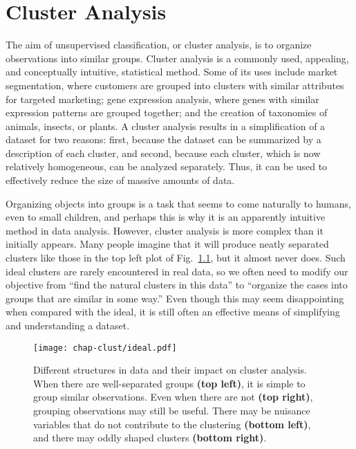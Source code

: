 

\chapter{Cluster Analysis}


The aim of unsupervised classification, or cluster analysis, is to
organize observations into similar groups.  Cluster analysis is a
commonly used, appealing, and conceptually intuitive, statistical
method.  Some of its uses include market segmentation, where customers
are grouped into clusters with similar attributes for targeted
marketing; gene expression analysis, where genes with similar
expression patterns are grouped together; and the creation of
taxonomies of animals, insects, or plants. A cluster analysis results
in a simplification of a dataset for two reasons: first, because the
dataset can be summarized by a description of each cluster, and
second, because each cluster, which is now relatively homogeneous, can
be analyzed separately.  Thus, it can be used to effectively reduce
the size of massive amounts of data.

Organizing objects into groups is a task that seems to come naturally
to humans, even to small children, and perhaps this is why it is an
apparently intuitive method in data analysis.  However, cluster
analysis is more complex than it initially appears.  Many people
imagine that it will produce neatly separated clusters like those in
the top left plot of Fig.~\ref{ideal-clusters}, but it almost never
does.  Such ideal clusters are rarely encountered in real data, so we
often need to modify our objective from ``find the natural clusters in
this data'' to ``organize the cases into groups that are similar in
some way.''  Even though this may seem disappointing when compared
with the ideal, it is still often an effective means of simplifying
and understanding a dataset.


\begin{figure}[ht]
\centerline{\texttt{[image: chap-clust/ideal.pdf]}}
\caption[Structures in data and their impact on cluster
analysis]{Different structures in data and their impact on cluster
analysis.  When there are well-separated groups {\bf (top left)}, it is
simple to group similar observations.  Even when there are not {\bf
(top right)}, grouping observations may still be useful. There may be
nuisance variables that do not contribute to the clustering {\bf
(bottom left)}, and there may oddly shaped clusters {\bf (bottom
right)}.}
\label{ideal-clusters}
\end{figure}

